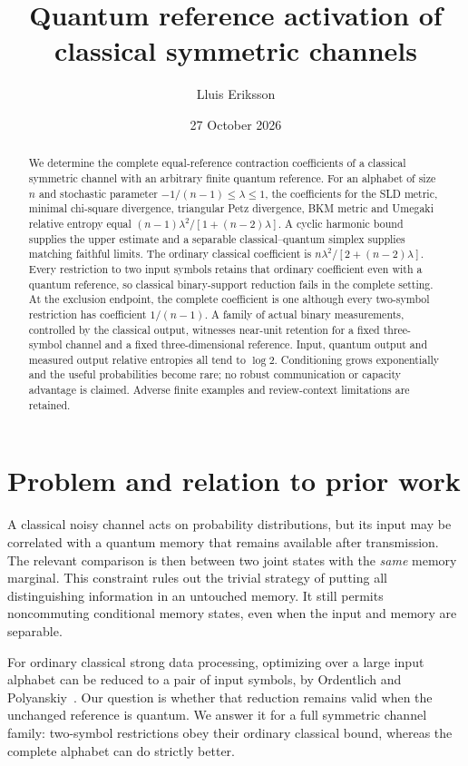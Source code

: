 \documentclass[11pt]{article}
\title{Quantum reference activation of classical symmetric channels}
\author{Lluis Eriksson}
\date{27 October 2026}
\theoremstyle{remark}\newtheorem{remark}[theorem]{Remark}
\begin{document}
\maketitle
\begin{abstract}
We determine the complete equal-reference contraction coefficients of a classical symmetric channel with an arbitrary finite quantum reference. For an alphabet of size $n$ and stochastic parameter $-1/(n-1)\leq\lambda\leq1$, the coefficients for the SLD metric, minimal chi-square divergence, triangular Petz divergence, BKM metric and Umegaki relative entropy equal $(n-1)\lambda^2/[1+(n-2)\lambda]$. A cyclic harmonic bound supplies the upper estimate and a separable classical--quantum simplex supplies matching faithful limits. The ordinary classical coefficient is $n\lambda^2/[2+(n-2)\lambda]$. Every restriction to two input symbols retains that ordinary coefficient even with a quantum reference, so classical binary-support reduction fails in the complete setting. At the exclusion endpoint, the complete coefficient is one although every two-symbol restriction has coefficient $1/(n-1)$. A family of actual binary measurements, controlled by the classical output, witnesses near-unit retention for a fixed three-symbol channel and a fixed three-dimensional reference. Input, quantum output and measured output relative entropies all tend to $\log2$. Conditioning grows exponentially and the useful probabilities become rare; no robust communication or capacity advantage is claimed. Adverse finite examples and review-context limitations are retained.
\end{abstract}

\section{Problem and relation to prior work}
A classical noisy channel acts on probability distributions, but its input may be correlated with a quantum memory that remains available after transmission. The relevant comparison is then between two joint states with the \emph{same} memory marginal. This constraint rules out the trivial strategy of putting all distinguishing information in an untouched memory. It still permits noncommuting conditional memory states, even when the input and memory are separable.

For ordinary classical strong data processing, optimizing over a large input alphabet can be reduced to a pair of input symbols, by Ordentlich and Polyanskiy~\cite{OP}. Our question is whether that reduction remains valid when the unchanged reference is quantum. We answer it for a full symmetric channel family: two-symbol restrictions obey their ordinary classical bound, whereas the complete alphabet can do strictly better.
\end{document}
